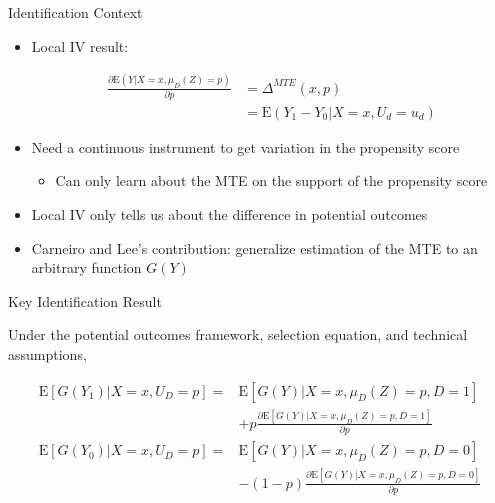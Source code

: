 \documentclass{beamer}
\newcommand{\E}{\mathrm{E}} %
\begin{document}
\begin{frame}{Identification Context}

\begin{itemize}

\item Local IV result:

\begin{align*}
  \frac{\partial \E \left( Y | X = x, \mu_D(Z) = p \right) }{\partial p} &= \Delta^{MTE}(x, p) \\
  &= \E \left( Y_1 - Y_0 | X = x, U_d = u_d \right)
\end{align*}


\item Need a continuous instrument to get variation in the propensity
  score
\begin{itemize}
\item Can only learn about the MTE on the support of the propensity
  score
\end{itemize}


\pause

\item Local IV only tells us about the difference in potential
  outcomes

\item Carneiro and Lee's contribution: generalize estimation of the
  MTE to an arbitrary function $G(Y)$

\end{itemize}

\end{frame}





\begin{frame}[shrink = 1]{Key Identification Result}

\begin{theorem}
  Under the potential outcomes framework, selection equation, and
  technical assumptions,

\vspace{-.25cm}
\begin{align*}
  \E\left[ G(Y_1) | X = x, U_D = p \right] = &\E \left[ G(Y) | X = x, \mu_D(Z) = p, D = 1 \right] \\
  &+ p \frac{\partial \E\left[ G(Y) | X = x, \mu_D(Z) = p, D = 1 \right]}{\partial p} \\
  \E\left[ G(Y_0) | X = x, U_D = p \right] = &\E \left[ G(Y) | X = x, \mu_D(Z) = p, D = 0 \right] \\
  &- (1 - p) \frac{\partial \E\left[ G(Y) | X = x, \mu_D(Z) = p, D = 0 \right]}{\partial p} \\
\end{align*}
\end{theorem}

\end{frame}
\end{document}
